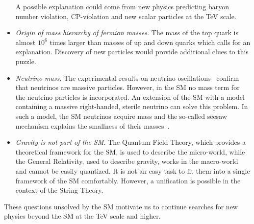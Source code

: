 \begin{itemize}
A possible explanation could come from new physics predicting baryon number violation, CP-violation and new scalar particles at the TeV scale.
\item \textit{Origin of mass hierarchy of fermion masses.} The mass of the top quark is almost $10^6$ times larger than masses of up and down quarks which calls for an explanation. Discovery of new particles would provide additional clues to this puzzle.
\item \textit{Neutrino mass.} The experimental results on neutrino oscillations~\cite{Fukuda:1998fd} confirm that neutrinos are massive particles. However, in the SM no mass term for the neutrino particles is incorporated. An extension of the SM with a model containing a massive right-handed, sterile neutrino can solve this problem. In such a model, the SM neutrinos acquire mass and the so-called seesaw mechanism explains the smallness of their masses~\cite{Mohapatra:1979ia}.
\item \textit{Gravity is not part of the SM.} The Quantum Field Theory, which provides a theoretical framework for the SM, is used to describe the micro-world, while the General Relativity, used to describe gravity, works in the macro-world and cannot be easily quantized. It is not an easy task to fit them into a single framework of the SM comfortably. However, a unification is possible in the context of the String Theory.
\end{itemize}

These questions unsolved by the SM motivate us to continue searches for new physics beyond the SM at the TeV scale and higher.




